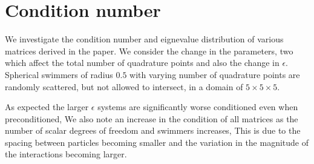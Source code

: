 \FloatBarrier
\section{Condition number}\label{appendix:ConNum}
We investigate the condition number and eignevalue distribution of various matrices derived in the paper. We consider the change in the parameters, two which affect the total number of quadrature points and also the change in $\epsilon$. Spherical swimmers of radius $0.5$ with varying number of quadrature points are randomly scattered, but not allowed to intersect, in a domain of $5 \times 5 \times 5$. 

As expected the larger $\epsilon$ systems are significantly worse conditioned even when preconditioned, We also note an increase in the condition of all matrices as the number of scalar degrees of freedom and swimmers increases, This is due to the spacing between particles becoming smaller and the variation in the magnitude of the interactions becoming larger. 

